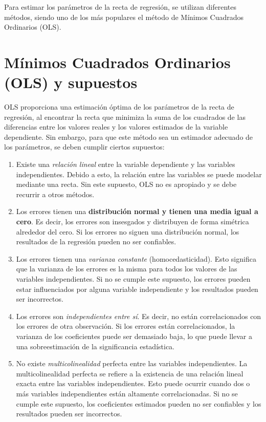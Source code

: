 \documentclass[
]{book}
\begin{document}
Para estimar los parámetros de la recta de regresión, se utilizan
diferentes métodos, siendo uno de los más populares el método de Mínimos
Cuadrados Ordinarios (OLS).

\hypertarget{muxednimos-cuadrados-ordinarios-ols-y-supuestos}{%
\section{Mínimos Cuadrados Ordinarios (OLS) y supuestos}\label{muxednimos-cuadrados-ordinarios-ols-y-supuestos}}

OLS proporciona una estimación óptima de los parámetros de la recta de
regresión, al encontrar la recta que minimiza la suma de los cuadrados
de las diferencias entre los valores reales y los valores estimados de
la variable dependiente. Sin embargo, para que este método sea un
estimador adecuado de los parámetros, se deben cumplir ciertos
supuestos:

\begin{enumerate}
\def\labelenumi{\arabic{enumi}.}
\item
  Existe una \emph{relación lineal} entre la variable dependiente y las
  variables independientes. Debido a esto, la relación entre las
  variables se puede modelar mediante una recta. Sin este supuesto,
  OLS no es apropiado y se debe recurrir a otros métodos.
\item
  Los errores tienen una \textbf{distribución normal y tienen una media
  igual a cero}. Es decir, los errores son insesgados y distribuyen
  de forma simétrica alrededor del cero. Si los errores no siguen una
  distribución normal, los resultados de la regresión pueden no ser
  confiables.
\item
  Los errores tienen una \emph{varianza constante} (homocedasticidad). Esto
  significa que la varianza de los errores es la misma para todos los
  valores de las variables independientes. Si no se cumple este
  supuesto, los errores pueden estar influenciados por alguna variable
  independiente y los resultados pueden ser incorrectos.
\item
  Los errores son \emph{independientes entre sí}. Es decir, no están
  correlacionados con los errores de otra observación. Si los errores
  están correlacionados, la varianza de los coeficientes puede ser
  demasiado baja, lo que puede llevar a una sobreestimación de la
  significancia estadística.
\item
  No existe \emph{multicolinealidad} perfecta entre las variables
  independientes. La multicolinealidad perfecta se refiere a la
  existencia de una relación lineal exacta entre las variables
  independientes. Esto puede ocurrir cuando dos o más variables
  independientes están altamente correlacionadas. Si no se cumple este
  supuesto, los coeficientes estimados pueden no ser confiables y los
  resultados pueden ser incorrectos.
\end{enumerate}
\end{document}

